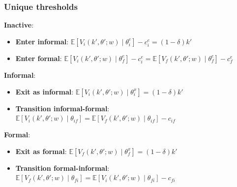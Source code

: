 \documentclass[aspectratio=169]{beamer}
\begin{document}
\begin{frame}[noframenumbering]
\frametitle{ Unique thresholds} \label{threshold}

\textbf{Inactive}:
\begin{itemize}
    \item \textbf{Enter informal}: $\mathbb{E}[V_i(k',\theta';w) \mid \theta_i^e] - c_i^e = (1 - \delta) k'$
    \item \textbf{Enter formal}: $\mathbb{E}[V_i(k',\theta';w) \mid \theta_f^e] - c_i^e = \mathbb{E}[V_f(k',\theta';w) \mid \theta_f^e] - c_f^e$
\end{itemize}

\textbf{Informal}:
\begin{itemize}
    \item \textbf{Exit as informal}: $\mathbb{E}[V_i(k',\theta';w) \mid \theta_i^x] = (1 - \delta) k'$
    \item \textbf{Transition informal-formal}: $\mathbb{E}[V_i(k',\theta';w) \mid \theta_{if}] = \mathbb{E}[V_f(k',\theta';w) \mid \theta_{if}] - c_{if}$
\end{itemize}

\textbf{Formal}:
\begin{itemize}
    \item \textbf{Exit as formal}: $\mathbb{E}[V_f(k',\theta';w) \mid \theta_f^x] = (1 - \delta) k'$
    \item \textbf{Transition formal-informal}: $\mathbb{E}[V_f(k',\theta';w) \mid \theta_{fi}] = \mathbb{E}[V_i(k',\theta';w) \mid \theta_{fi}] - c_{fi}$
\end{itemize}

\vspace{5mm}

\hyperlink{transition}{}

\end{frame}

\end{document}
